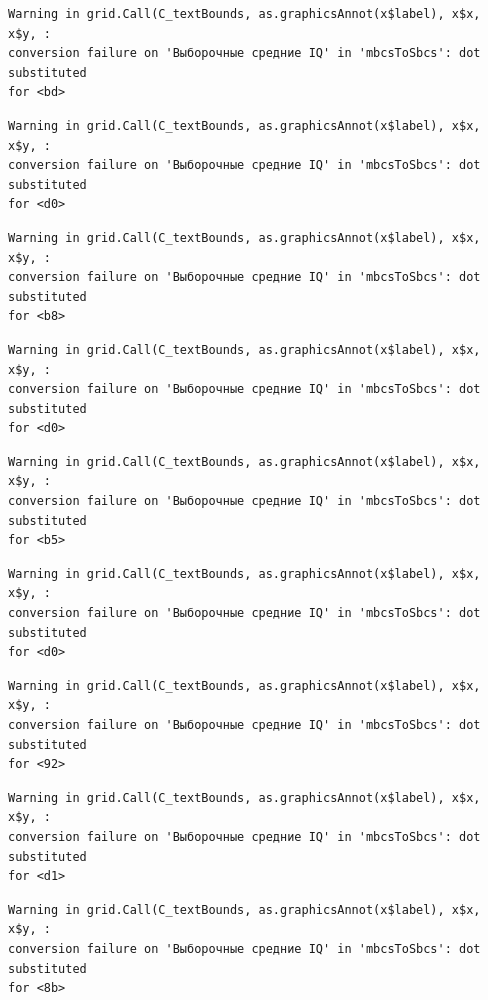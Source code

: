 \documentclass[
  letterpaper,
]{scrbook}
\theoremstyle{definition}
\theoremstyle{remark}
\begin{document}
\begin{verbatim}
Warning in grid.Call(C_textBounds, as.graphicsAnnot(x$label), x$x, x$y, :
conversion failure on 'Выборочные средние IQ' in 'mbcsToSbcs': dot substituted
for <bd>
\end{verbatim}

\begin{verbatim}
Warning in grid.Call(C_textBounds, as.graphicsAnnot(x$label), x$x, x$y, :
conversion failure on 'Выборочные средние IQ' in 'mbcsToSbcs': dot substituted
for <d0>
\end{verbatim}

\begin{verbatim}
Warning in grid.Call(C_textBounds, as.graphicsAnnot(x$label), x$x, x$y, :
conversion failure on 'Выборочные средние IQ' in 'mbcsToSbcs': dot substituted
for <b8>
\end{verbatim}

\begin{verbatim}
Warning in grid.Call(C_textBounds, as.graphicsAnnot(x$label), x$x, x$y, :
conversion failure on 'Выборочные средние IQ' in 'mbcsToSbcs': dot substituted
for <d0>
\end{verbatim}

\begin{verbatim}
Warning in grid.Call(C_textBounds, as.graphicsAnnot(x$label), x$x, x$y, :
conversion failure on 'Выборочные средние IQ' in 'mbcsToSbcs': dot substituted
for <b5>
\end{verbatim}

\begin{verbatim}
Warning in grid.Call(C_textBounds, as.graphicsAnnot(x$label), x$x, x$y, :
conversion failure on 'Выборочные средние IQ' in 'mbcsToSbcs': dot substituted
for <d0>
\end{verbatim}

\begin{verbatim}
Warning in grid.Call(C_textBounds, as.graphicsAnnot(x$label), x$x, x$y, :
conversion failure on 'Выборочные средние IQ' in 'mbcsToSbcs': dot substituted
for <92>
\end{verbatim}

\begin{verbatim}
Warning in grid.Call(C_textBounds, as.graphicsAnnot(x$label), x$x, x$y, :
conversion failure on 'Выборочные средние IQ' in 'mbcsToSbcs': dot substituted
for <d1>
\end{verbatim}

\begin{verbatim}
Warning in grid.Call(C_textBounds, as.graphicsAnnot(x$label), x$x, x$y, :
conversion failure on 'Выборочные средние IQ' in 'mbcsToSbcs': dot substituted
for <8b>
\end{verbatim}
\end{document}
